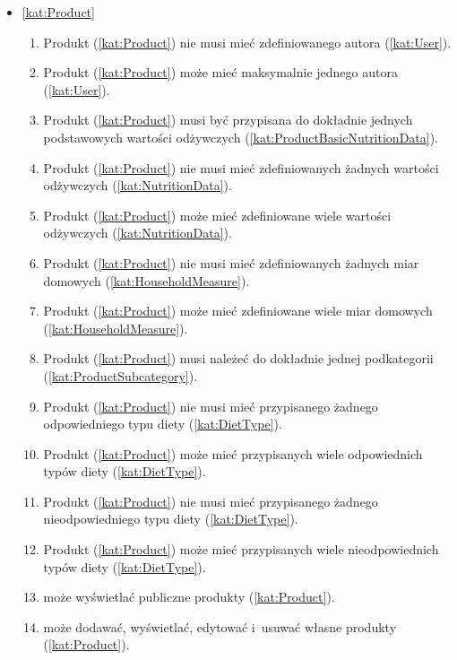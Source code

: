 \begin{itemize}[label={\textbf{Reguły dla}}, wide, labelwidth=!, labelindent=0pt]
    \setlength\itemsep{1.75em}
    \item\ref{kat:Product}\mynobreakpar
    \begin{enumerate}[label={\textbf{REG/2/\protect\twodigits{\arabic{enumi}}}}, wide, labelwidth=!, align=left, leftmargin=3cm]
        \item Produkt (\ref{kat:Product}) nie musi mieć zdefiniowanego autora (\ref{kat:User}).
        \item Produkt (\ref{kat:Product}) może mieć maksymalnie jednego autora (\ref{kat:User}).
        \item Produkt (\ref{kat:Product}) musi być przypisana do dokładnie jednych podstawowych wartości odżywczych (\ref{kat:ProductBasicNutritionData}).
        \item Produkt (\ref{kat:Product}) nie musi mieć zdefiniowanych żadnych wartości odżywczych (\ref{kat:NutritionData}).
        \item Produkt (\ref{kat:Product}) może mieć zdefiniowane wiele wartości odżywczych (\ref{kat:NutritionData}).
        \item Produkt (\ref{kat:Product}) nie musi mieć zdefiniowanych żadnych miar domowych (\ref{kat:HouseholdMeasure}).
        \item Produkt (\ref{kat:Product}) może mieć zdefiniowane wiele miar domowych (\ref{kat:HouseholdMeasure}).
        \item Produkt (\ref{kat:Product}) musi należeć do dokładnie jednej podkategorii (\ref{kat:ProductSubcategory}).
        \item Produkt (\ref{kat:Product}) nie musi mieć przypisanego żadnego odpowiedniego typu diety (\ref{kat:DietType}).
        \item Produkt (\ref{kat:Product}) może mieć przypisanych wiele odpowiednich typów diety (\ref{kat:DietType}).
        \item Produkt (\ref{kat:Product}) nie musi mieć przypisanego żadnego nieodpowiedniego typu diety (\ref{kat:DietType}).
        \item Produkt (\ref{kat:Product}) może mieć przypisanych wiele nieodpowiednich typów diety (\ref{kat:DietType}).
        \item {} może wyświetlać publiczne produkty (\ref{kat:Product}).
        \item {} może dodawać, wyświetlać, edytować i~usuwać własne produkty (\ref{kat:Product}).

\end{enumerate}
\end{itemize}
